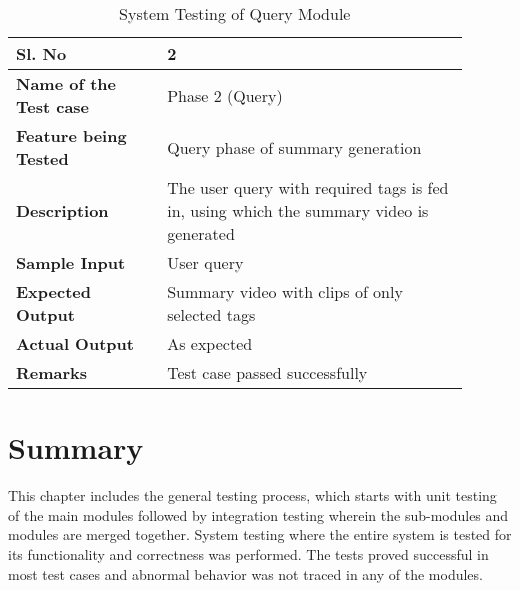     \FloatBarrier
    \begin{table}[H]
        \caption{System Testing of Query Module}
        \begin{tabular}{|p{0.3\linewidth}|p{0.6\linewidth}|}
            \hline
            \textbf{Sl. No }              &\textbf{ 2}\\
            \hline
            \textbf{Name of the Test case}& Phase 2 (Query) \\
            \hline
            \textbf{Feature being Tested}  & Query phase of summary generation \\
            \hline
            \textbf{Description}           & The user query with required tags
            is fed in, using which the summary video is generated \\
            \hline
            \textbf{Sample Input}          & User query \\
            \hline
            \textbf{Expected Output}       & Summary video with clips of only
            selected tags \\
            \hline
            \textbf{Actual Output}         & As expected \\
            \hline
            \textbf{Remarks }              & Test case passed successfully \\
            \hline
        \end{tabular}
        \label{table:system-query}
    \end{table}

\section{Summary}

This chapter includes the general testing process, which starts with unit
testing of the main modules followed by integration testing wherein the
sub-modules and modules are merged together. System testing where the entire
system is tested for its functionality and correctness was performed. The tests
proved successful in most test cases and abnormal behavior was not traced in
any of the modules.